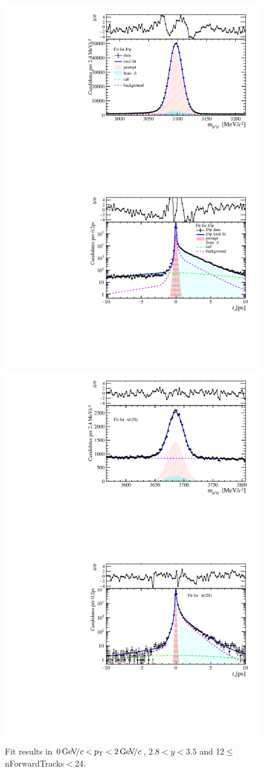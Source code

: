 \begin{figure}[H]
\begin{center}
\includegraphics[width=0.47\linewidth]{pdf/Jpsi/drawmassF/n2y2pt1.pdf}
\includegraphics[width=0.47\linewidth]{pdf/Jpsi/2DFitF/n2y2pt1.pdf}
\vspace*{-0.5cm}
\includegraphics[width=0.47\linewidth]{pdf/Psi2S/drawmassF/n2y2pt1.pdf}
\includegraphics[width=0.47\linewidth]{pdf/Psi2S/2DFitF/n2y2pt1.pdf}
\vspace*{-0.5cm}
\end{center}
\caption{Fit results in $0\text{\,Ge\kern -0.1em V\!/}c<p_{\mathrm{T}}<2\text{\,Ge\kern -0.1em V\!/}c$, $2.8<y<3.5$ and 12$\leq$nForwardTracks$<$24.}
\label{Fitn2y2pt1}
\end{figure}
